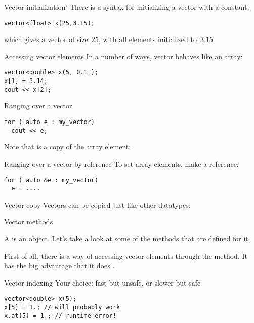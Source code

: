 \begin{block}{Vector initialization'}
  \label{sl:vector-initconst}
  There is a syntax for initializing a vector with a constant:
\begin{verbatim}
vector<float> x(25,3.15);
\end{verbatim}
which gives a vector of size~25, with all elements initialized to~3.15.
\end{block}

\begin{block}{Accessing vector elements}
  \label{sl:vectorsub}
  In a number of ways, vector behaves like an array:
\begin{verbatim}
vector<double> x(5, 0.1 );
x[1] = 3.14;
cout << x[2];
\end{verbatim}
\end{block}

\begin{block}{Ranging over a vector}
  \label{sl:vector-range}
\begin{verbatim}
for ( auto e : my_vector)
  cout << e;
\end{verbatim}
Note that  is a copy of the array element:
\end{block}

\begin{block}{Ranging over a vector by reference}
  \label{sl:vector-range-ref}
To set array elements, make  a reference:
\begin{verbatim}
for ( auto &e : my_vector)
  e = ....
\end{verbatim}
\end{block}

\begin{block}{Vector copy}
  \label{sl:vectorcopy}
  Vectors can be copied just like other datatypes:
\end{block}

 {Vector methods}

A  is an object. Let's take a look at some of the methods
that are defined for it.

First of all, there is a way of accessing vector elements through the
 method. It has the big advantage that it does
.
\begin{block}{Vector indexing}
  \label{sl:vector-index}
  Your choice:  fast but unsafe, or slower but safe
\begin{verbatim}
vector<double> x(5);
x[5] = 1.; // will probably work
x.at(5) = 1.; // runtime error!
\end{verbatim}
\end{block}


